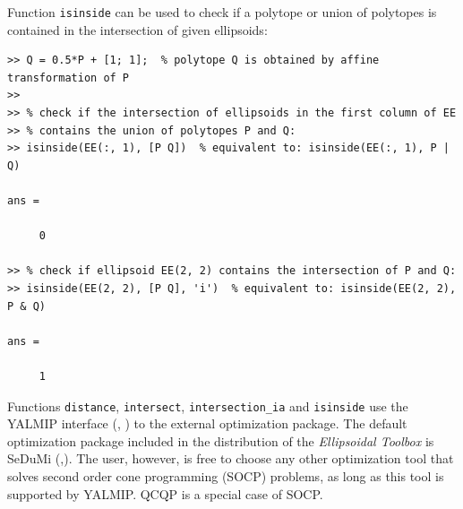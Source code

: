 \documentclass{report}
\begin{document}
Function {\tt isinside} can be used to check if a polytope or union of
polytopes is contained in the intersection of given ellipsoids:
{\tt \begin{verbatim}
>> Q = 0.5*P + [1; 1];  % polytope Q is obtained by affine transformation of P
>>
>> % check if the intersection of ellipsoids in the first column of EE
>> % contains the union of polytopes P and Q:
>> isinside(EE(:, 1), [P Q])  % equivalent to: isinside(EE(:, 1), P | Q)

ans =

     0

>> % check if ellipsoid EE(2, 2) contains the intersection of P and Q:
>> isinside(EE(2, 2), [P Q], 'i')  % equivalent to: isinside(EE(2, 2), P & Q)

ans =

     1
\end{verbatim} }
Functions {\tt distance}, {\tt intersect}, {\tt intersection\_ia} and
{\tt isinside} use the YALMIP interface (\cite{yalmip}, \cite{yalmiphp}) to the
external optimization package. The default optimization package included
in the distribution of the {\it Ellipsoidal Toolbox} is SeDuMi
(\cite{sedumi},\cite{sedumihp}). The user, however, is free to choose
any other optimization tool that solves second order cone programming (SOCP)
problems, as long as this tool is supported by YALMIP. QCQP is a special case
of SOCP.
\end{document}
